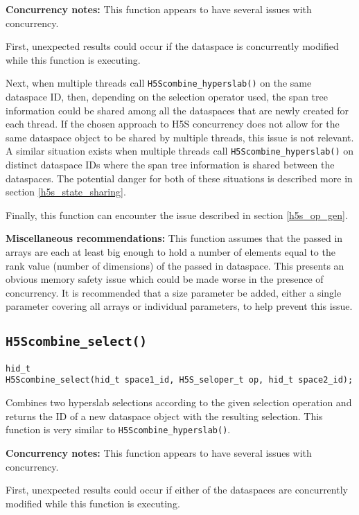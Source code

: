 \documentclass[../HDF5_RFC.tex]{subfiles}
\begin{document}
\textbf{Concurrency notes:} This function appears to have several issues with concurrency.

First, unexpected results could occur if the dataspace is concurrently modified while this
function is executing.

Next, when multiple threads call \texttt{H5Scombine\_hyperslab()} on the same dataspace ID,
then, depending on the selection operator used, the span tree information could be shared
among all the dataspaces that are newly created for each thread. If the chosen approach to
H5S concurrency does not allow for the same dataspace object to be shared by multiple threads,
this issue is not relevant. A similar situation exists when multiple threads call
\texttt{H5Scombine\_hyperslab()} on distinct dataspace IDs where the span tree information
is shared between the dataspaces. The potential danger for both of these situations is
described more in section \ref{h5s_state_sharing}.

Finally, this function can encounter the issue described in section \ref{h5s_op_gen}.

\textbf{Miscellaneous recommendations:} This function assumes that the passed in arrays are
each at least big enough to hold a number of elements equal to the rank value (number of
dimensions) of the passed in dataspace. This presents an obvious memory safety issue which
could be made worse in the presence of concurrency. It is recommended that a size parameter
be added, either a single parameter covering all arrays or individual parameters, to help
prevent this issue.

\subsection{\texttt{H5Scombine\_select()}}
\label{apdx:h5s_func_h5scombine_select}

\begin{verbatim}
hid_t
H5Scombine_select(hid_t space1_id, H5S_seloper_t op, hid_t space2_id);
\end{verbatim}

Combines two hyperslab selections according to the given selection operation and returns
the ID of a new dataspace object with the resulting selection. This function is very similar
to \texttt{H5Scombine\_hyperslab()}.

\textbf{Concurrency notes:} This function appears to have several issues with concurrency.

First, unexpected results could occur if either of the dataspaces are concurrently modified
while this function is executing.
\end{document}
